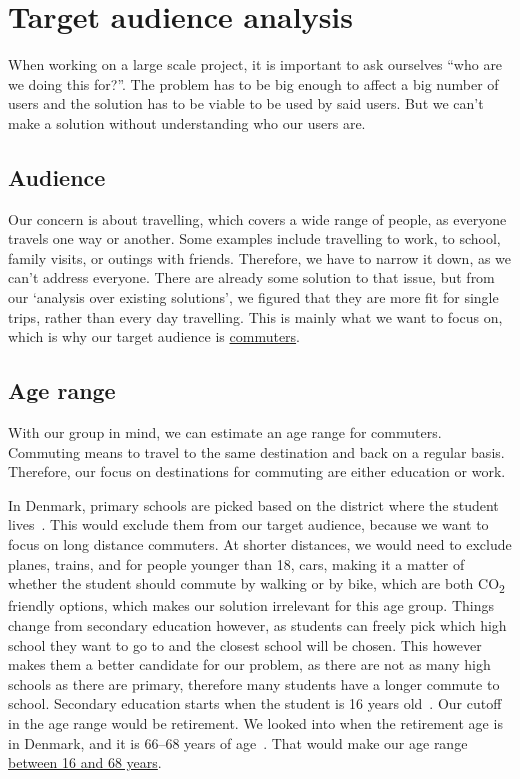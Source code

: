 \section{Target audience analysis}\label{sec:target-audience-analysis}

When working on a large scale project, it is important to ask ourselves ``who are we doing this for?''.
The problem has to be big enough to affect a big number of users and the solution has to be viable to be used by said
users.
But we can't make a solution without understanding who our users are.

\subsection{Audience}\label{subsec:audience}

Our concern is about travelling, which covers a wide range of people, as everyone travels one way or another.
Some examples include travelling to work, to school, family visits, or outings with friends.
Therefore, we have to narrow it down, as we can't address everyone.
There are already some solution to that issue, but from our `analysis over existing solutions', we figured that they are
more fit for single trips, rather than every day travelling.
This is mainly what we want to focus on, which is why our target audience is \underline{commuters}.

\subsection{Age range}\label{subsec:age-range}

With our group in mind, we can estimate an age range for commuters.
Commuting means to travel to the same destination and back on a regular basis.
Therefore, our focus on destinations for commuting are either education or work.

In Denmark, primary schools are picked based on the district where the student lives~\cite{primary_school}.
This would exclude them from our target audience, because we want to focus on long distance commuters.
At shorter distances, we would need to exclude planes, trains, and for people younger than 18, cars, making it a matter
of whether the student should commute by walking or by bike, which are both \unit{CO_{2}} friendly options, which makes
our solution irrelevant for this age group.
Things change from secondary education however, as students can freely pick which high school they want to go to and the
closest school will be chosen.
This however makes them a better candidate for our problem, as there are not as many high schools as there are primary,
therefore many students have a longer commute to school.
Secondary education starts when the student is 16 years old~\cite{secondary_school}.
Our cutoff in the age range would be retirement.
We looked into when the retirement age is in Denmark, and it is 66--68 years of age~\cite{retirement}.
That would make our age range \underline{between 16 and 68 years}.

